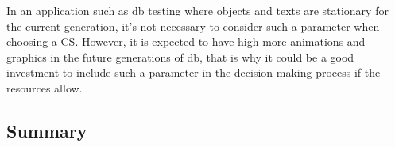 In an application such as \gls{db} testing where objects and texts are stationary for the current generation, it's not necessary to consider such a parameter when choosing a CS. However, it is expected to have high more animations and graphics in the future generations of \gls{db}, that is why it could be a good investment to include such a parameter in the decision making process if the resources allow.

\subsection{Summary}




